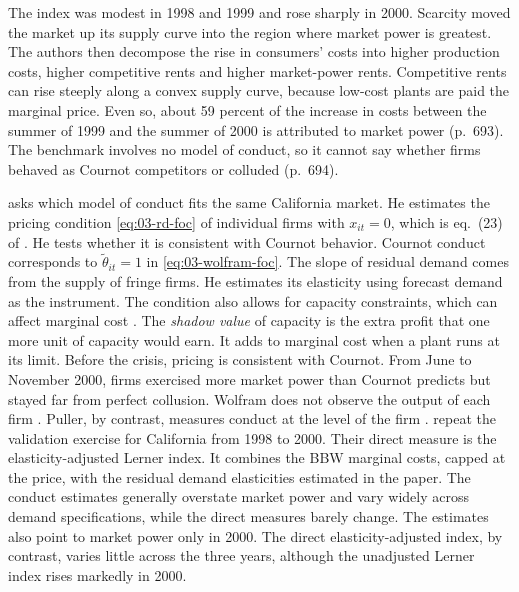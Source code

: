 The index was modest in 1998 and 1999 and rose sharply in 2000. Scarcity moved the market up its supply curve into
the region where market power is greatest. The authors then decompose the rise in consumers' costs into higher
production costs, higher competitive rents and higher market-power rents. Competitive rents can rise steeply along a
convex supply curve, because low-cost plants are paid the marginal price. Even so, about 59 percent of the increase
in costs between the summer of 1999 and the summer of 2000 is attributed to market power (p.~693). The benchmark
involves no model of conduct, so it cannot say whether firms behaved as Cournot competitors or colluded (p.~694).

\citet{Puller2007} asks which model of conduct fits the same California market. He estimates the pricing condition
\eqref{eq:03-rd-foc} of individual firms with $x_{it} = 0$, which is eq.~(23) of \citet{KelloggReguant2021}. He
tests whether it is consistent with Cournot behavior. Cournot conduct corresponds to $\tilde\theta_{it} = 1$ in
\eqref{eq:03-wolfram-foc}. The slope of residual demand comes from the supply of fringe firms. He estimates its
elasticity using forecast demand as the instrument. The condition also allows for capacity constraints, which can
affect marginal cost \citep[p.~694]{KelloggReguant2021}. The \emph{shadow value} of capacity is the extra profit that
one more unit of capacity would earn. It adds to marginal cost when a plant runs at its limit. Before the crisis,
pricing is consistent with Cournot. From June to November 2000, firms exercised more market power than Cournot
predicts but stayed far from perfect collusion. Wolfram does not observe the output of each firm
\citep[p.~693]{KelloggReguant2021}. Puller, by contrast, measures conduct at the level of the firm
\citep[p.~146]{HortacsuPerrigne2021}.
\citet{KimKnittel2006} repeat the validation exercise for California from 1998 to 2000. Their direct measure is the
elasticity-adjusted Lerner index. It combines the BBW marginal costs, capped at the price, with the residual demand
elasticities estimated in the paper. The conduct estimates generally overstate market power and vary widely across demand
specifications, while the direct measures barely change. The estimates also point to market power only in 2000. The
direct elasticity-adjusted index, by contrast, varies little across the three years, although the unadjusted Lerner
index rises markedly in 2000.

